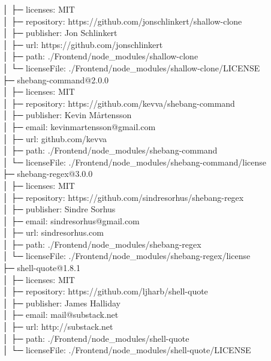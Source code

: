 \documentclass[
    paper=a4,
    twoside=false,
    parskip=half,
    listof=entryprefix,
    listof=totoc,
    index=totoc,
    bibliography=totoc,
    headsepline,
]{scrbook}
\begin{document}
    │  ├─ licenses: MIT\\
    │  ├─ repository: https://github.com/jonschlinkert/shallow-clone\\
    │  ├─ publisher: Jon Schlinkert\\
    │  ├─ url: https://github.com/jonschlinkert\\
    │  ├─ path: ./Frontend/node\_modules/shallow-clone\\
    │  └─ licenseFile: ./Frontend/node\_modules/shallow-clone/LICENSE\\
    ├─ shebang-command@2.0.0\\
    │  ├─ licenses: MIT\\
    │  ├─ repository: https://github.com/kevva/shebang-command\\
    │  ├─ publisher: Kevin Mårtensson\\
    │  ├─ email: kevinmartensson@gmail.com\\
    │  ├─ url: github.com/kevva\\
    │  ├─ path: ./Frontend/node\_modules/shebang-command\\
    │  └─ licenseFile: ./Frontend/node\_modules/shebang-command/license\\
    ├─ shebang-regex@3.0.0\\
    │  ├─ licenses: MIT\\
    │  ├─ repository: https://github.com/sindresorhus/shebang-regex\\
    │  ├─ publisher: Sindre Sorhus\\
    │  ├─ email: sindresorhus@gmail.com\\
    │  ├─ url: sindresorhus.com\\
    │  ├─ path: ./Frontend/node\_modules/shebang-regex\\
    │  └─ licenseFile: ./Frontend/node\_modules/shebang-regex/license\\
    ├─ shell-quote@1.8.1\\
    │  ├─ licenses: MIT\\
    │  ├─ repository: https://github.com/ljharb/shell-quote\\
    │  ├─ publisher: James Halliday\\
    │  ├─ email: mail@substack.net\\
    │  ├─ url: http://substack.net\\
    │  ├─ path: ./Frontend/node\_modules/shell-quote\\
    │  └─ licenseFile: ./Frontend/node\_modules/shell-quote/LICENSE\\
\end{document}
